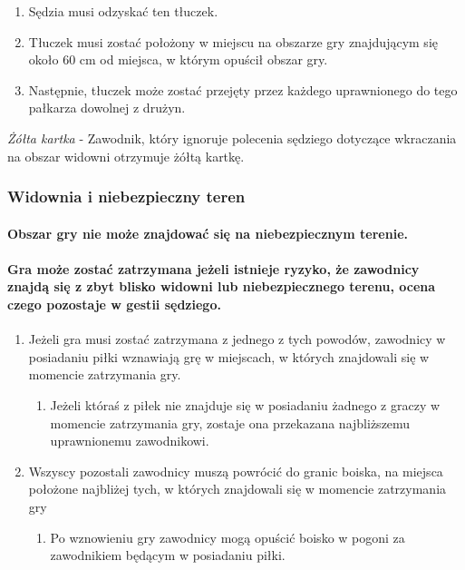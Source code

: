 \documentclass[12pt]{article}
\begin{document}
\begin{enumerate}
\begin{enumerate}
		            \begin{enumerate}
			            \item
			                  Sędzia musi odzyskać ten tłuczek.
			            \item
			                  Tłuczek musi zostać położony w miejscu na obszarze gry znajdującym
			                  się około 60 cm od miejsca, w którym opuścił obszar gry.
			            \item
			                  Następnie, tłuczek może zostać przejęty przez każdego uprawnionego
			                  do tego pałkarza dowolnej z drużyn.
		            \end{enumerate}
	      \end{enumerate}
\end{enumerate}

\emph{Żółta kartka} - Zawodnik, który ignoruje polecenia sędziego
dotyczące wkraczania na obszar widowni otrzymuje żółtą kartkę.

\subsubsection{Widownia i niebezpieczny teren}

\paragraph{Obszar gry nie może znajdować się na niebezpiecznym terenie.}

\paragraph{Gra może zostać zatrzymana jeżeli istnieje ryzyko, że
	zawodnicy znajdą się z zbyt blisko widowni lub niebezpiecznego terenu,
	ocena czego pozostaje w gestii sędziego.}

\begin{enumerate}
	\item
	      Jeżeli gra musi zostać zatrzymana z jednego z tych powodów, zawodnicy
	      w posiadaniu piłki wznawiają grę w miejscach, w których znajdowali się
	      w momencie zatrzymania gry.

	      \begin{enumerate}
		      \item
		            Jeżeli któraś z piłek nie znajduje się w posiadaniu żadnego z graczy
		            w momencie zatrzymania gry, zostaje ona przekazana najbliższemu
		            uprawnionemu zawodnikowi.
	      \end{enumerate}
	\item
	      Wszyscy pozostali zawodnicy muszą powrócić do granic boiska, na
	      miejsca położone najbliżej tych, w których znajdowali się w momencie
	      zatrzymania gry

	      \begin{enumerate}
		      \item
		            Po wznowieniu gry zawodnicy mogą opuścić boisko w pogoni za
		            zawodnikiem będącym w posiadaniu piłki.
	      \end{enumerate}
\end{enumerate}
\end{document}
